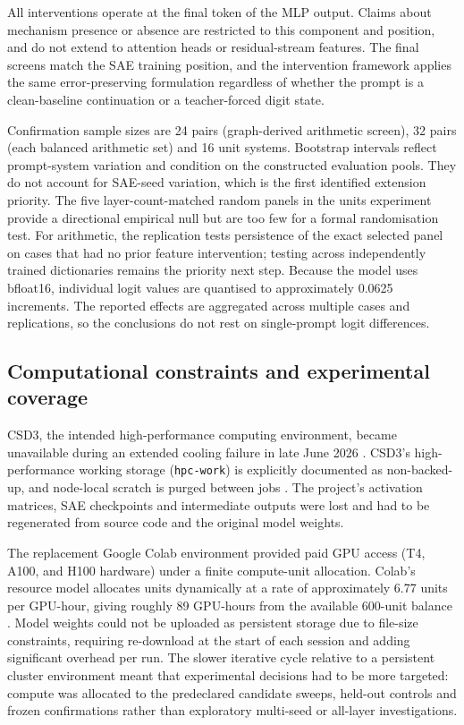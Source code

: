 \documentclass[11pt,a4paper]{article}
\begin{document}
All interventions operate at the final token of the MLP output. Claims about mechanism presence or absence are restricted to this component and position, and do not extend to attention heads or residual-stream features. The final screens match the SAE training position, and the intervention framework applies the same error-preserving formulation regardless of whether the prompt is a clean-baseline continuation or a teacher-forced digit state.

Confirmation sample sizes are 24 pairs (graph-derived arithmetic screen), 32 pairs (each balanced arithmetic set) and 16 unit systems. Bootstrap intervals reflect prompt-system variation and condition on the constructed evaluation pools. They do not account for SAE-seed variation, which is the first identified extension priority. The five layer-count-matched random panels in the units experiment provide a directional empirical null but are too few for a formal randomisation test. For arithmetic, the replication tests persistence of the exact selected panel on cases that had no prior feature intervention; testing across independently trained dictionaries remains the priority next step. Because the model uses bfloat16, individual logit values are quantised to approximately 0.0625 increments. The reported effects are aggregated across multiple cases and replications, so the conclusions do not rest on single-prompt logit differences.

\subsection{Computational constraints and experimental coverage}

CSD3, the intended high-performance computing environment, became unavailable during an extended cooling failure in late June 2026 \cite{csd3incident}. CSD3's high-performance working storage (\texttt{hpc-work}) is explicitly documented as non-backed-up, and node-local scratch is purged between jobs \cite{csd3storage}. The project's activation matrices, SAE checkpoints and intermediate outputs were lost and had to be regenerated from source code and the original model weights.

The replacement Google Colab environment provided paid GPU access (T4, A100, and H100 hardware) under a finite compute-unit allocation. Colab's resource model allocates units dynamically at a rate of approximately 6.77 units per GPU-hour, giving roughly 89 GPU-hours from the available 600-unit balance \cite{colabfaq}. Model weights could not be uploaded as persistent storage due to file-size constraints, requiring re-download at the start of each session and adding significant overhead per run. The slower iterative cycle relative to a persistent cluster environment meant that experimental decisions had to be more targeted: compute was allocated to the predeclared candidate sweeps, held-out controls and frozen confirmations rather than exploratory multi-seed or all-layer investigations.
\end{document}
